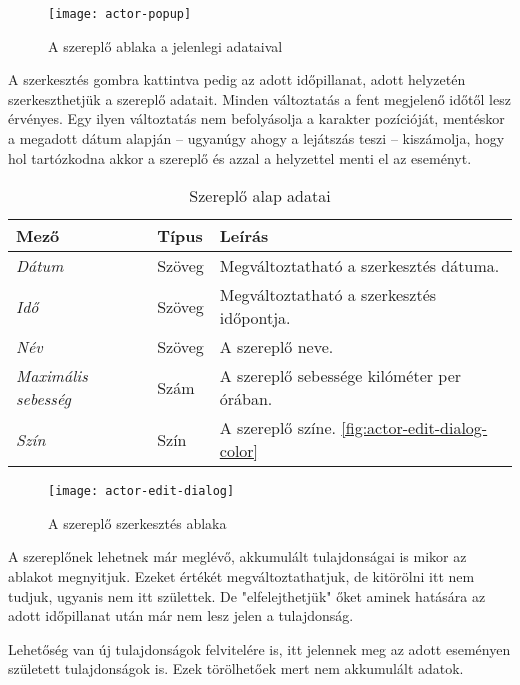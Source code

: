\begin{figure}[h!]
	\centering
	\texttt{[image: actor-popup]}
	\caption{A szereplő ablaka a jelenlegi adataival}
	\label{fig:actor-popup}
\end{figure}

A szerkesztés gombra kattintva pedig az adott időpillanat, adott helyzetén szerkeszthetjük a szereplő adatait. Minden változtatás a fent megjelenő időtől lesz érvényes. Egy ilyen változtatás nem befolyásolja a karakter pozícióját, mentéskor a megadott dátum alapján -- ugyanúgy ahogy a lejátszás teszi -- kiszámolja, hogy hol tartózkodna akkor a szereplő és azzal a helyzettel menti el az eseményt.

\begin{table}[H]
	\centering
	\begin{tabular}{ | m{} | m{} | m{} | }
		\hline
		\textbf{Mező} & \textbf{Típus} & \textbf{Leírás} \\
		\hline \hline
		\emph{Dátum} & Szöveg & Megváltoztatható a szerkesztés dátuma. \\
		\hline
		\emph{Idő} & Szöveg & Megváltoztatható a szerkesztés időpontja. \\
		\hline
		\emph{Név} & Szöveg & A szereplő neve.  \\
		\hline
		\emph{Maximális sebesség} & Szám & A szereplő sebessége kilóméter per órában. \\
		\hline
		\emph{Szín} & Szín & A szereplő színe. \ref{fig:actor-edit-dialog-color}  \\
		\hline
	\end{tabular}
	\caption{Szereplő alap adatai}
	\label{tab:create-project-form}
\end{table}

\begin{figure}[h!]
	\centering
	\texttt{[image: actor-edit-dialog]}
	\caption{A szereplő szerkesztés ablaka}
	\label{fig:actor-edit-dialog}
\end{figure}

A szereplőnek lehetnek már meglévő, akkumulált tulajdonságai is mikor az ablakot megnyitjuk. Ezeket értékét megváltoztathatjuk, de kitörölni itt nem tudjuk, ugyanis nem itt születtek. De "elfelejthetjük" őket aminek hatására az adott időpillanat után már nem lesz jelen a tulajdonság.

Lehetőség van új tulajdonságok felvitelére is, itt jelennek meg az adott eseményen született tulajdonságok is. Ezek törölhetőek mert nem akkumulált adatok.

